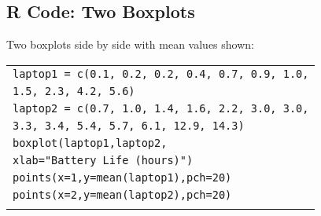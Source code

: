 \subsection{R Code: Two Boxplots}
\begin{frame}{\bf {}}
Two boxplots side by side with mean values shown:\\[0.2cm]
\begin{tabular}{|l|}
\hline
\texttt{laptop1 = c(0.1, 0.2,  0.2, 0.4,  0.7, 0.9,  1.0,}\\
\hspace{2.8cm}\texttt{1.5, 2.3,  4.2, 5.6)}\\
\texttt{laptop2 = c(0.7, 1.0, 1.4, 1.6, 2.2, 3.0, 3.0,}\\
\hspace{2.8cm}\texttt{3.3, 3.4, 5.4, 5.7, 6.1, 12.9, 14.3)}\\[0.2cm]
\texttt{boxplot(laptop1,laptop2,}\\
\hspace{2.8cm}\texttt{xlab="Battery Life (hours)")}\\
\texttt{points(x=1,y=mean(laptop1),pch=20)}\\
\texttt{points(x=2,y=mean(laptop2),pch=20)}\\
\hline
\multicolumn{1}{c}{}\\[-0.1cm]
\end{tabular}




 


 

 



 

\end{frame}

